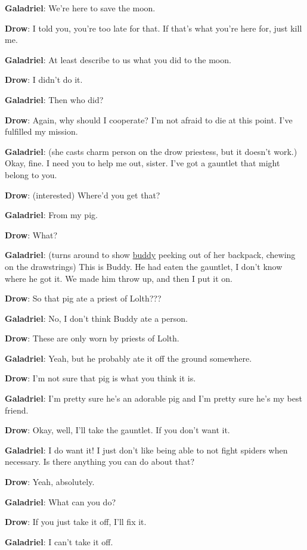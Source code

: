 \documentclass[smalldemyvopaper,11pt,twoside,onecolumn,openright,extrafontsizes]{memoir}
\begin{document}
\textbf{Galadriel}: We're here to save the moon.

\textbf{Drow}: I told you, you're too late for that. If that's what
you're here for, just kill me.

\textbf{Galadriel}: At least describe to us what you did to the moon.

\textbf{Drow}: I didn't do it.

\textbf{Galadriel}: Then who did?

\textbf{Drow}: Again, why should I cooperate? I'm not afraid to die at
this point. I've fulfilled my mission.

\textbf{Galadriel}: (she casts charm person on the drow priestess, but
it doesn't work.) Okay, fine. I need you to help me out, sister. I've
got a gauntlet that might belong to you.

\textbf{Drow}: (interested) Where'd you get that?

\textbf{Galadriel}: From my pig.

\textbf{Drow}: What?

\textbf{Galadriel}: (turns around to show
\href{/characters/buddy/}{buddy} peeking out of her backpack, chewing on
the drawstrings) This is Buddy. He had eaten the gauntlet, I don't know
where he got it. We made him throw up, and then I put it on.

\textbf{Drow}: So that pig ate a priest of Lolth???

\textbf{Galadriel}: No, I don't think Buddy ate a person.

\textbf{Drow}: These are only worn by priests of Lolth.

\textbf{Galadriel}: Yeah, but he probably ate it off the ground
somewhere.

\textbf{Drow}: I'm not sure that pig is what you think it is.

\textbf{Galadriel}: I'm pretty sure he's an adorable pig and I'm pretty
sure he's my best friend.

\textbf{Drow}: Okay, well, I'll take the gauntlet. If you don't want it.

\textbf{Galadriel}: I do want it! I just don't like being able to not
fight spiders when necessary. Is there anything you can do about that?

\textbf{Drow}: Yeah, absolutely.

\textbf{Galadriel}: What can you do?

\textbf{Drow}: If you just take it off, I'll fix it.

\textbf{Galadriel}: I can't take it off.
\end{document}
